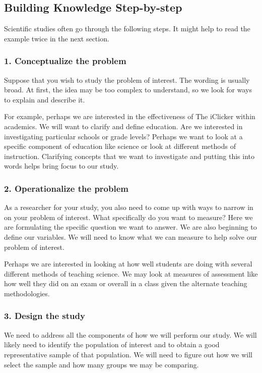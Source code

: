 \documentclass[11pt]{book}\usepackage[]{graphicx}\usepackage[]{color}
\begin{document}
\subsection{Building Knowledge Step-by-step}

Scientific studies often go through the following steps.  It might help to read the example twice in the next section.

\subsubsection{1. Conceptualize the problem} 

Suppose that you wish to study the problem of interest.  The wording is usually broad. At first, the idea may be too complex to understand, so we look for ways to explain and describe it.

For example, perhaps we are interested in the effectiveness of The iClicker within academics.  We will want to clarify and define education.  Are we interested in investigating particular schools or grade levels?  Perhaps we want to look at a specific component of education like science or look at different methods of instruction.   Clarifying concepts that we want to investigate and putting this into words helps bring focus to our study.

\subsubsection{2. Operationalize the problem}

As a researcher for your study, you also need to come up with ways to narrow in on your problem of interest.  What specifically do you want to measure?  Here we are formulating the specific question we want to answer.  We are also beginning to define our variables.  We will need to know what we can measure to help solve our problem of interest.

Perhaps we are interested in looking at how well students are doing with several different methods of teaching science.  We may look at measures of assessment like how well they did on an exam or overall in a class given the alternate teaching methodologies.

\subsubsection{3. Design the study}

We need to address all the components of how we will perform our study.  We will likely need to identify the population of interest and to obtain a good representative sample of that population.  We will need to figure out how we will select the sample and how many groups we may be comparing.
\end{document}
